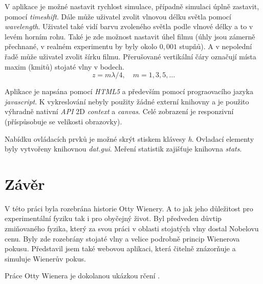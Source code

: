 \documentclass[12pt,a4paper,titlepage,final]{report}
\begin{document}
V aplikace je možné nastavit rychlost simulace, případně simulaci úplně zastavit, pomocí \emph{timeshift}.
Dále může uživatel zvolit vlnovou délku světla pomocí \emph{wavelength}. Uživatel také vidí barvu zvoleného 
světla podle vlnové délky a to v levém horním rohu. Také je zde možnost nastavit 
úhel filmu (úhly jsou zámerně přechnané, v realném experimentu by byly okolo $0,001$ stupňů). A v nepolední řadě může uživatel
zvolit šírku filmu. Přerušované vertikální čáry označují místa maxim (kmitů) stojaté vlny v bodech.
\begin{equation}
z = m\lambda / 4, \quad m=1,3,5,\ldots
\end{equation}

Aplikace je napsána pomocí \emph{HTML5} a především pomocí prograovacího jazyka \emph{javascript}. K vykreslování
nebyly použity žádné externí knihovny a je použito výhradně nativní \emph{API} 2D \emph{context} a \emph{canvas}.
Celé zobrazení je responzivní (příspůsobuje se velikosti obrazovky). 

Nabídku ovládacích prvků je možné skrýt stiskem klávesy \emph{h}. Ovladací elementy byly vytvořeny knihovnou \emph{dat.gui}. Meření 
statistik zajišťuje knihovna \emph{stats}.

\section{Závěr}
V této práci byla rozebrána historie Otty Wienery. A to jak jeho důležitost pro experimentální fyziku tak i pro obyčejný život. 
Byl předveden důvtip zmiňovaného fyzika, který za svou práci v oblasti stojatých vlny dostal Nobelovu cenu. Byly zde rozebrány 
stojaté vlny a velice podrobně princip Wienerova pokusu. Představil jsem také webovou aplikaci, která čitelně znázorňuje a simuluje
Wienerův pokus.

Práce Otty Wienera je dokolanou ukázkou rčení .

\textcolor{white}{
	\citep{wiki_otto}
	\citep{encyclopedia_otto}
	\cite{report}
	\citep{skullsinthestars}
}




\end{document}
